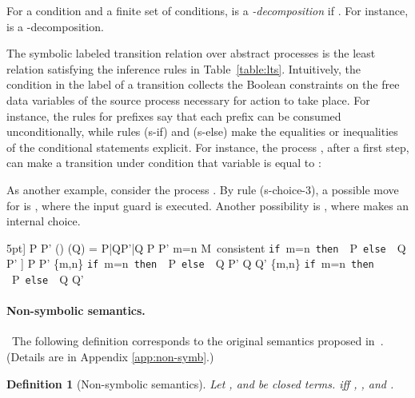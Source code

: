 \documentclass[submission,copyright,creativecommons]{eptcs}
\makeatletter
\newcommand{\opaque}{\square}
\newcommand{\ifte}[3]{{\tt if}\ #1\ {\tt then }\ #2\ {\tt else }\ #3}
\newcommand{\fn}{\mathit{fn}}
\newcommand{\bn}{\mathit{bn}}
\newcommand{\act}{\lambda}
\newcommand{\tr}[1]{\stackrel{#1}{\rightarrowfill}}
\def \rightarrowfill{\m@th\mathord{\smash-}\mkern-6mu\cleaders\hbox{}\hfill
  \mkern-6mu\mathord\rightarrow}
\newtheorem{definition1}{Definition}
\makeatother
\begin{document}
For  a condition and  a finite set of
conditions,  is a {\em -decomposition} if .  For instance,  is a
-decomposition.

The symbolic labeled transition relation  over abstract 
processes is the least relation satisfying the inference rules in
Table~\ref{table:lts}. 
Intuitively, the condition  in the label  of a transition 
collects the Boolean constraints on the free data variables of the source 
process necessary for action  to take place. For instance, the rules 
for prefixes say that each prefix can be consumed unconditionally, while 
rules ({\sc s-if}) and ({\sc  s-else}) make the equalities or inequalities of 
the conditional statements explicit. For instance, the process , after a first step, can make a transition
under condition that variable  is equal to :

As another example, consider the process . 
By rule ({\sc s-choice-3}), a possible move for  is , 
where the input guard is executed. Another possibility is , where 
 makes an internal choice. 


\begin{table}[t]
 5pt]
					 {P\tr {M, \act} P' \quad \bn(\act) \cap \fn(Q) = \emptyset}{P\;|\;Q\tr{M,\act}P'\;|\;Q}
                                         \hfill
                                         {P\tr {M, \act} P' \quad m=n \wedge M~\mbox{consistent}}
                                         {\ifte{m=n}{P}{Q} \tr {m=n \wedge M,\act} P'}
                                         \15pt]
  {P \tr {M, \act} P' \quad  \opaque\in\{m,n\}}
  {\ifte{m=n}{P}{Q} \tr {M, \act} P'}
  \qquad \qquad 
  {Q \tr {M, \act} Q' \quad  \opaque\in\{m,n\}}
  {\ifte{m=n}{P}{Q} \tr {M, \act} Q'}
  \
\caption{Symbolic LTS for processes}
\label{table:lts}
\end{table}







\paragraph{Non-symbolic semantics.} \
The following definition corresponds to the original semantics proposed in~\cite{BM:APOL}. (Details are in Appendix \ref{app:non-symb}.)

\begin{definition1}[Non-symbolic semantics] \label{def:alt-non-symb-sem}
Let ,  and  be closed terms.  iff  , ,  and .
\end{definition1}
\end{document}
